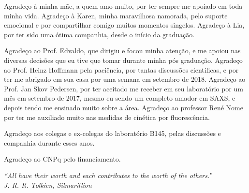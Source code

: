 \documentclass[
	12pt,				%
	openright,			%
	twoside,			%
	a4paper,			%
	english,			%
	brazil%
	]{abntex2}
\begin{document}
\begin{agradecimentos}

Agradeço à minha mãe, a quem amo muito, por ter sempre me apoiado em toda minha vida. Agradeço à Karen, minha maravilhosa namorada, pelo suporte emocional e por compartilhar comigo muitos momentos singelos. Agradeço à Lia, por ter sido uma ótima companhia, desde o início da graduação.

Agradeço ao Prof. Edvaldo, que dirigiu e focou minha atenção, e me apoiou nas diversas decisões que eu tive que tomar durante minha pós graduação. Agradeço ao Prof. Heinz Hoffmann pela paciência, por tantas discussões científicas, e por ter me abrigado em sua casa por uma semana em setembro de 2018. Agradeço ao Prof. Jan Skov Pedersen, por ter aceitado me receber em seu laboratório por um mês em setembro de 2017, mesmo eu sendo um completo amador em SAXS, e depois tendo me ensinado muito sobre a área. Agradeço ao professor René Nome por ter me auxiliado muito nas medidas de cinética por fluorescência.

Agradeço aos colegas e ex-colegas do laboratório B145, pelas discussões e companhia durante esses anos.

Agradeço ao CNPq pelo financiamento.

\end{agradecimentos}

\begin{epigrafe}
    \vspace*{\fill}
	\begin{flushright}
		\textit{``All have their worth and each contributes to the worth of the others.'' \\ J. R. R. Tolkien, Silmarillion}
	\end{flushright}
\end{epigrafe}

\end{document}
